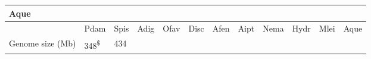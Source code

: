 \documentclass[]{elsarticle} %
\begin{document}
\begin{longtable}[]{@{}llllllllllll@{}}
\begin{minipage}[b]{0.05\columnwidth}
Aque\strut
\end{minipage}\tabularnewline
\midrule
\endfirsthead
\toprule
\begin{minipage}[b]{0.15\columnwidth}\raggedright\strut
\strut
\end{minipage} & \begin{minipage}[b]{0.05\columnwidth}\raggedright\strut
Pdam\strut
\end{minipage} & \begin{minipage}[b]{0.05\columnwidth}\raggedright\strut
Spis\strut
\end{minipage} & \begin{minipage}[b]{0.05\columnwidth}\raggedright\strut
Adig\strut
\end{minipage} & \begin{minipage}[b]{0.05\columnwidth}\raggedright\strut
Ofav\strut
\end{minipage} & \begin{minipage}[b]{0.05\columnwidth}\raggedright\strut
Disc\strut
\end{minipage} & \begin{minipage}[b]{0.05\columnwidth}\raggedright\strut
Afen\strut
\end{minipage} & \begin{minipage}[b]{0.05\columnwidth}\raggedright\strut
Aipt\strut
\end{minipage} & \begin{minipage}[b]{0.05\columnwidth}\raggedright\strut
Nema\strut
\end{minipage} & \begin{minipage}[b]{0.05\columnwidth}\raggedright\strut
Hydr\strut
\end{minipage} & \begin{minipage}[b]{0.05\columnwidth}\raggedright\strut
Mlei\strut
\end{minipage} & \begin{minipage}[b]{0.05\columnwidth}\raggedright\strut
Aque\strut
\end{minipage}\tabularnewline
\midrule
\endhead
\begin{minipage}[t]{0.15\columnwidth}\raggedright\strut
Genome size (Mb)\strut
\end{minipage} & \begin{minipage}[t]{0.05\columnwidth}\raggedright\strut
348\textsuperscript{\$}\strut
\end{minipage} & \begin{minipage}[t]{0.05\columnwidth}\raggedright\strut
434\strut
\end{minipage} & \begin{minipage}[t]{0.05\columnwidth}\raggedright\strut

\end{minipage}
\end{longtable}
\end{document}
